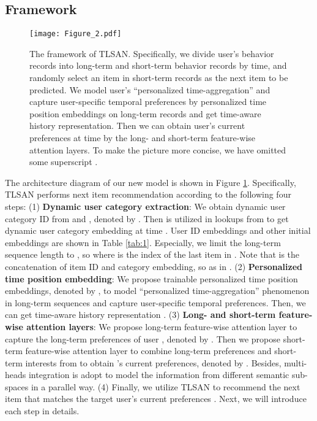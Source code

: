 \documentclass[preprint,12pt]{elsarticle}
\newcommand{\tool}{TLSAN\xspace}
\begin{document}
\begin{sloppypar}
\subsection{Framework}

\begin{figure}
	\centering
	\texttt{[image: Figure\_2.pdf]}
	\caption{The framework of \tool. Specifically, we divide user's behavior records into long-term and short-term behavior records by time, and randomly select an item in short-term records as the next item to be predicted. We model user's ``personalized time-aggregation'' and capture user-specific temporal preferences by personalized time position embeddings on long-term records and get time-aware history representation. Then we can obtain user's current preferences at time  by the long- and short-term feature-wise attention layers. To make the picture more concise, we have omitted some superscript .}\label{fig:2}
\end{figure}

The architecture diagram of our new model is shown in Figure \ref{fig:2}. Specifically, \tool performs next item recommendation according to the following four steps: (1) \textbf{Dynamic user category extraction}: We obtain dynamic user category ID from  and , denoted by . Then  is utilized in lookups from  to get dynamic user category embedding at time . User ID embeddings  and other initial embeddings are shown in Table \ref{tab:1}. Especially, we limit the long-term sequence length to , so  where  is the index of the last item in . Note that  is the concatenation of item ID and category embedding, so as  in . (2) \textbf{Personalized time position embedding}: We propose trainable personalized time position embeddings, denoted by , to model ``personalized time-aggregation'' phenomenon in long-term sequences and capture user-specific temporal preferences. Then, we can get time-aware history representation . (3) \textbf{Long- and short-term feature-wise attention layers}: We propose long-term feature-wise attention layer to capture the long-term preferences of user , denoted by . Then we propose short-term feature-wise attention layer to combine long-term preferences  and short-term interests from  to obtain 's current preferences, denoted by . Besides, multi-heads integration is adopt to model the information from different semantic sub-spaces in a parallel way. (4) Finally, we utilize \tool to recommend the next item that matches the target user's current preferences . 
Next, we will introduce each step in details.



\end{sloppypar}
\end{document}
